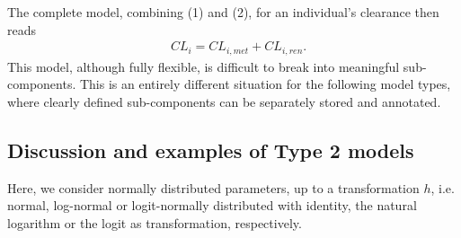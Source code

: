 The complete model, combining (1) and (2), for an individual's clearance then reads
\begin{align*}
& CL_i = CL_{i,met} + CL_{i,ren}.
\end{align*}
This model, although fully flexible, is difficult to break into meaningful sub-components. This is an entirely different situation for the following model types, where clearly defined sub-components can be separately stored and annotated.

\subsection{Discussion and examples of Type 2 models}
\label{subsec:paramModelType2}
Here, we consider normally distributed parameters, up to a transformation $h$, i.e. normal, log-normal or logit-normally distributed with identity, the natural logarithm or the logit as transformation, respectively.

